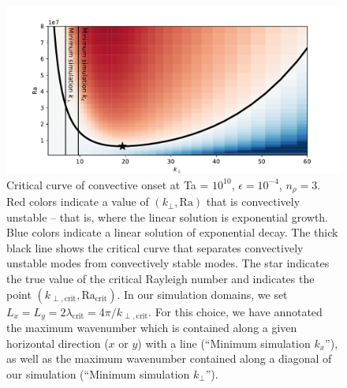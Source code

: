 \begin{figure}[t!]
\includegraphics[width=\textwidth]{./figs/revisions/crit_curve_ta1e10.pdf}
\caption[Critical Rayleigh number curve for a rotating, polytropic atmosphere.]{ 
	Critical curve of convective onset at Ta = $10^{10}$, $\epsilon = 10^{-4}$, $n_\rho = 3$.
	Red colors indicate a value of $(k_\perp, \text{Ra})$ that is convectively unstable -- that is, where the linear solution is exponential growth.
	Blue colors indicate a linear solution of exponential decay.
	The thick black line shows the critical curve that separates convectively unstable modes from convectively stable modes.
	The star indicates the true value of the critical Rayleigh number and indicates the point $(k_{\perp, \text{crit}}, \text{Ra}_{\text{crit}})$.
	In our simulation domains, we set $L_x = L_y = 2 \lambda_\text{crit} = 4\pi / k_{\perp, \text{crit}}$.
	For this choice, we have annotated the maximum wavenumber which is contained along a given horizontal direction ($x$ or $y$) with a line (``Minimum simulation $k_x$''), as well as the maximum wavenumber contained along a diagonal of our simulation (``Minimum simulation $k_\perp$'').
	\label{fig:ta1e10_onset} }
\end{figure}

